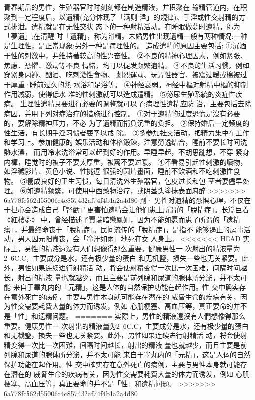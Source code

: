 \documentclass[12pt,UTF8]{ctexbook}
\begin{document}
青春期后的男性，生殖器官时时刻刻都在制造精液，并积聚在
输精管道内，在积聚到一定程度后，以遺精(充分体现了「满则
溢」的規律)、手淫或性交射精的方式排泄。遣精就是在无性交状
态下的一种射精活动。在睡眠做夢时遺精，称为「夢遺」;在清醒
时「遺精」，称为滑精。未婚男性出现遺精一般有两种情况:一种
是生理性，是正常现象;另外一种是病理性的。
造成遣精的原因主要包括:
①沉湎于性的刺激中，并维持著较高的性兴奋性。
②不良的精神心理因素，例如紧张、焦慮、恐懼、激动等不良
情緒，均可以促发频繁遺精。
③不良的生活习惯，例如穿紧身内褲、酗酒、吃刺激性食物、
劇烈運动、玩弄性器官、被窩过暖或棉被过于厚重·睡前过久的熱
水浴和足浴等。
④神经衰弱。神经中樞对射精中樞的抑制作用减弱，使得低水
准的性刺激就可以造成遣精。
⑤泌尿生殖系統的炎症性疾病。
生理性遣精只要进行必要的调整就可以了;病理性遺精应防
治，主要包括去除病因，并用下列对症治疗的措施进行控制。
①对于遺精的过度恐慌是沒有必要的，要解除精神压力，不必
为了遺精而掯負沉重的负担。
②保持婚后一定频度的性生活，有长期手淫习惯者要予以戒
除。
③多参加社交活动，把精力集中在工作和学习上。参加健康的
娛乐活动和体格鍛鍊，注意勞逸结合，睡前不要长时间洗熱水澡，
而用冷水洗浴常可以起到好的作用。早睡早起，不胡思亂想，不穿
紧身内褲，睡觉时的被子不要太厚重，被窩不要过暖。
④不看易引起性刺激的讀物，如淫穢影片、黄色小说、性挑逗
很强的圆片畫面，睡前不飲酒和不吃刺激性食物。
⑤養成良好的卫生习惯，每日清洗外生殖器官，包皮过长和包
茎者要儘早处理。
⑥如遺精频繁，可使用中西藥物治疗，或阴茎头塗抹表面麻醉
>>>>>>> 6a778fc562d55006c4c857432af74f4b1a2a4d80
劑·
男性对遗精的恐惧心理，不仅在于担心会造成自己「腎虧」’
更害怕遗精会让他们患上所谓的「脫精症」。长篇巨着《紅樓夢》
中，曾经描述了賈瑞暗戀鳳姐，因为不能如愿而患了所谓的「遗精
癆」，并最终命丧于「脫精症」。民间流传的「脫精症」，是指不
能够遏止的房事活动，男人因元阳盡丧，会「冷汗如雨」地死在女
人身上。
<<<<<<< HEAD
实际上，男性的精液遠没有人们想像得那么重要。健康男性一
次射出的精液量为2~6C.C，主要成分是水，还有极少量的蛋白
和无机鹽，损失一些也无关紧要。此外，男性如果连续进行射精活
动，将会使射精变得一次比一次困难，间隔时间越长，射出的精液
量也就越少，而且主要是前列腺和尿道的腺体所分泌，并不太可能
来自于睾丸内的「元精」，这是人体的自然保护功能在起作用。性
交中确实存在意外死亡的病例，主要与男性本身就可能存在潛在的
威脅生命的疾病有关，因为性交需要耗費大量的体力而诱发，例如
心肌梗塞、高血压等，真正要命的并不是「性」和遗精问题。
=======
实際上，男性的精液遠沒有人們想像得那么重要。健康男性一
次射出的精液量为2~6C.C，主要成分是水，还有极少量的蛋白
和无機鹽，损失一些也无关紧要。此外，男性如果连续进行射精活
动，将会使射精变得一次比一次困難，间隔时间越长，射出的精液
量也就越少，而且主要是前列腺和尿道的腺体所分泌，并不太可能
来自于睾丸内的「元精」，这是人体的自然保护功能在起作用。性
交中確实存在意外死亡的病例，主要与男性本身就可能存在潛在的
威脅生命的疾病有关，因为性交需要耗費大量的体力而诱发，例如
心肌梗塞、高血压等，真正要命的并不是「性」和遺精问題。
>>>>>>> 6a778fc562d55006c4c857432af74f4b1a2a4d80
\end{document}
